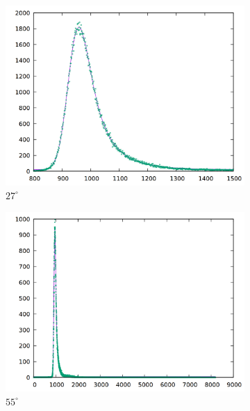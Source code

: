 
\begin{figure}[h]
  \centering
  \begin{subfigure}[h]{0.49\textwidth}
    \centering
    \includegraphics[width=\textwidth]{data/temp/na_roomtemp.png}
    \caption{$27^\circ$}
  \end{subfigure}%
  \begin{subfigure}[h]{0.49\textwidth}
    \centering
    \includegraphics[width=\textwidth]{data/temp/na_55.png}
    \caption{$55^\circ$}
  \end{subfigure}
  \begin{subfigure}[h]{0.49\textwidth}
    \centering

\end{subfigure}
\end{figure}
